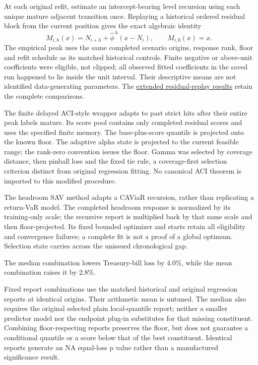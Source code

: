 \documentclass[10pt,a4paper]{article}
\begin{document}
At each original refit, estimate an intercept-bearing level recursion
using each unique mature adjacent transition once. Replaying a historical ordered
residual block from the current position gives the exact algebraic identity
\[
M_{i,h}(x)=N_{i+h}+\widehat\phi^{\,h}(x-N_i),\qquad M_{i,0}(x)=x.
\]
The empirical peak uses the same completed scenario origins, response rank,
floor and refit schedule as its matched historical controls. Finite negative or
above-unit coefficients were eligible, not clipped; all observed fitted
coefficients in the saved run happened to lie inside the unit interval.
Their descriptive means are not identified data-generating parameters.
The \href{https://github.com/ByronLi0207/financial-mathematics-paper-20261020/blob/submission-final/EXTENDED_RESULTS.md#asmbi-extended-s07}{extended residual-replay results} retain the complete comparisons.

The finite delayed ACI-style wrapper adapts to past strict hits after their entire peak labels mature. Its score pool contains only completed residual
scores and uses the specified finite memory. The base-plus-score quantile is
projected onto the known floor. The adaptive alpha state is projected to the
current feasible range; the rank-zero convention issues the floor. Gamma was
selected by coverage distance, then pinball loss and the fixed tie rule, a
coverage-first selection criterion distinct from original regression fitting.
No canonical ACI theorem is imported to this modified procedure.

The headroom SAV method adapts a CAViaR recursion, rather than replicating a
return-VaR model. The completed headroom response is normalized by its
training-only scale; the recursive report is multiplied back by that same
scale and then floor-projected. Its fixed bounded optimizer and starts retain
all eligibility and convergence failures; a complete fit is not a proof of a
global optimum. Selection state carries across the unissued chronological gap.

The median combination lowers Treasury-bill loss by 4.0\%, while the mean combination raises it by 2.8\%.

Fixed report combinations use the matched historical and original
regression reports at identical origins. Their arithmetic mean is untuned.
The median also requires the original selected plain local-quantile report;
neither a smaller predictor model nor the endpoint plug-in substitutes for
that missing constituent. Combining floor-respecting reports preserves the floor, but does not guarantee a conditional quantile or a score below that of the best constituent. Identical reports generate an NA equal-loss p value rather
than a manufactured significance result.
\end{document}

